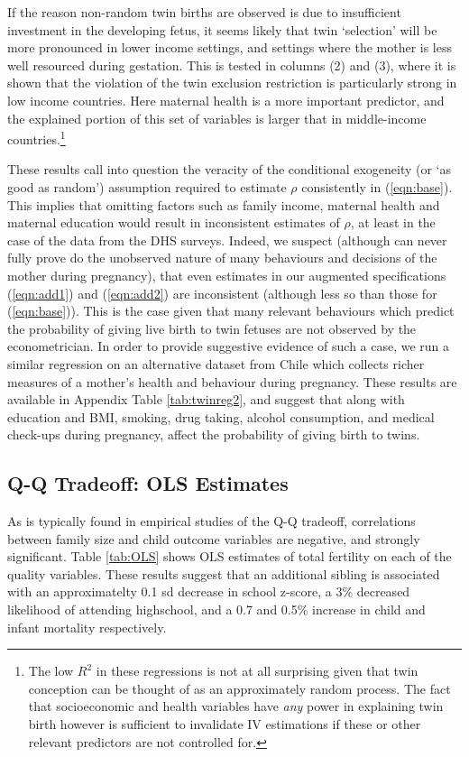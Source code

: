 \documentclass{article}[12pt,subeqn]
\begin{document}
\begin{spacing}{1.5}
If the reason non-random twin births are observed is due to insufficient investment in the developing fetus, it seems likely that twin `selection' will be more pronounced in lower income settings, and settings where the mother is less well resourced during gestation.  This is tested in columns (2) and (3), where it is shown that the violation of the twin exclusion restriction is particularly strong in low income countries.  Here maternal health is a more important predictor, and the explained portion of this set of variables is larger that in middle-income countries.\footnote{The low $R^2$ in these regressions is not at all surprising given that twin conception can be thought of as an approximately random process.  The fact that socioeconomic and health variables have \emph{any} power in explaining twin birth however is sufficient to invalidate IV estimations if these or other relevant predictors are not controlled for.}

These results call into question the veracity of the conditional exogeneity (or `as good as random') assumption required to estimate $\rho$ consistently in (\ref{eqn:base}).  This implies that omitting factors such as family income, maternal health and maternal education would result in inconsistent estimates of $\rho$, at least in the case of the data from the DHS surveys.  Indeed, we suspect (although can never fully prove do the unobserved nature of many behaviours and decisions of the mother during pregnancy), that even estimates in our augmented specifications (\ref{eqn:add1}) and (\ref{eqn:add2}) are inconsistent (although less so than those for (\ref{eqn:base})).  This is the case given that many relevant behaviours which predict the probability of giving live birth to twin fetuses are not observed by the econometrician.  In order to provide suggestive evidence of such a case, we run a similar regression on an alternative dataset from Chile which collects richer measures of a mother's health and behaviour during pregnancy.  These results are available in Appendix Table \ref{tab:twinreg2}, and suggest that along with education and BMI, smoking, drug taking, alcohol consumption, and medical check-ups during pregnancy, affect the probability of giving birth to twins.

\subsection{Q-Q Tradeoff: OLS Estimates}
As is typically found in empirical studies of the Q-Q tradeoff, correlations between family size and child outcome variables are negative, and strongly significant.  Table \ref{tab:OLS} shows OLS estimates of total fertility on each of the quality variables.  These results suggest that an additional sibling is associated with an approximatelty 0.1 sd decrease in school z-score, a 3\% decreased likelihood of attending highschool, and a 0.7 and 0.5\% increase in child and infant mortality respectively.


\end{spacing}
\end{document}
